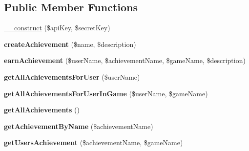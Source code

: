 \subsection*{Public Member Functions}
\begin{DoxyCompactItemize}
\item 
\hyperlink{class_achievement_service_a49f2ad222e06420736d750e167d55d7c}{\+\_\+\+\_\+construct} (\$api\+Key, \$secret\+Key)
\item 
\hypertarget{class_achievement_service_a6ee1b4ad0e8f637b6e1989e5b03289dc}{{\bfseries create\+Achievement} (\$name, \$description)}\label{class_achievement_service_a6ee1b4ad0e8f637b6e1989e5b03289dc}

\item 
\hypertarget{class_achievement_service_a7552cd304fa9720ce55467788305c40c}{{\bfseries earn\+Achievement} (\$user\+Name, \$achievement\+Name, \$game\+Name, \$description)}\label{class_achievement_service_a7552cd304fa9720ce55467788305c40c}

\item 
\hypertarget{class_achievement_service_abd9c7ddd8369754993a0bf7f2dc9bacb}{{\bfseries get\+All\+Achievements\+For\+User} (\$user\+Name)}\label{class_achievement_service_abd9c7ddd8369754993a0bf7f2dc9bacb}

\item 
\hypertarget{class_achievement_service_ae439b4b44d5ec0eb9533882cc173ab2f}{{\bfseries get\+All\+Achievements\+For\+User\+In\+Game} (\$user\+Name, \$game\+Name)}\label{class_achievement_service_ae439b4b44d5ec0eb9533882cc173ab2f}

\item 
\hypertarget{class_achievement_service_a7c38ffd6c60c1af5a8d83ac3bc7043cb}{{\bfseries get\+All\+Achievements} ()}\label{class_achievement_service_a7c38ffd6c60c1af5a8d83ac3bc7043cb}

\item 
\hypertarget{class_achievement_service_a3e979921a984629af759f3faabd1377d}{{\bfseries get\+Achievement\+By\+Name} (\$achievement\+Name)}\label{class_achievement_service_a3e979921a984629af759f3faabd1377d}

\item 
\hypertarget{class_achievement_service_ac8c5899c6fd45d8a9b1fb6d9edbdb955}{{\bfseries get\+Users\+Achievement} (\$achievement\+Name, \$game\+Name)}\label{class_achievement_service_ac8c5899c6fd45d8a9b1fb6d9edbdb955}

\end{DoxyCompactItemize}
